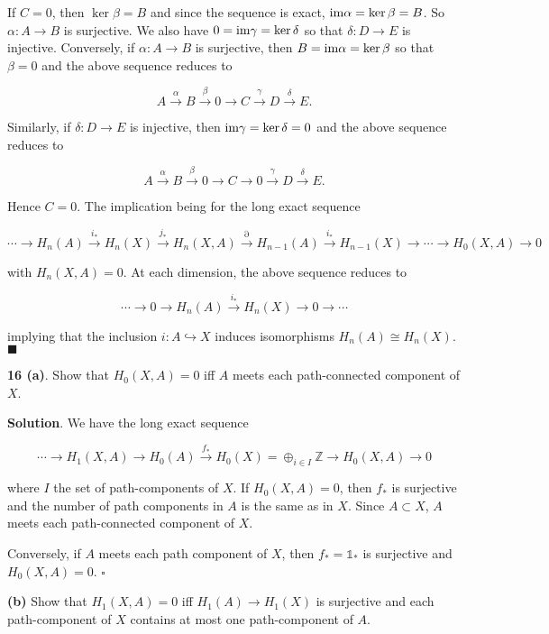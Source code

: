 \documentclass{article}
\newcommand{\Z}{\mathbb{Z}}
\newcommand{\identity}{\mathds{1}}
\newcommand{\im}{\textnormal{im}}
\begin{document}
If $C = 0$, then $\ker \beta = B$ and since the sequence is exact, $\im \alpha = \ker \beta = B$. So $\alpha: A\to B$ is surjective. We also have $0 = \im \gamma = \ker \delta$ so that $\delta:D\to E$ is injective. Conversely, if $\alpha: A\to B$ is surjective, then $B = \im \alpha = \ker \beta$ so that $\beta = 0$ and the above sequence reduces to

$$A\xrightarrow{\alpha} B\xrightarrow{\beta} 0\to C\xrightarrow{\gamma} D\xrightarrow{\delta} E.$$

Similarly, if $\delta: D\to E$ is injective, then $\im \gamma = \ker \delta = 0$ and the above sequence reduces to

$$A\xrightarrow{\alpha} B\xrightarrow{\beta} 0\to C\to 0\xrightarrow{\gamma} D\xrightarrow{\delta} E.$$

Hence $C = 0$. The implication being for the long exact sequence

$$\cdots \to H_{n}(A)\xrightarrow{i_{\ast}} H_{n}(X)\xrightarrow{j_{\ast}}H_{n}(X, A)\xrightarrow{\partial} H_{n-1}(A)\xrightarrow{i_{\ast}} H_{n-1}(X)\to \cdots \to H_{0}(X, A)\to 0$$

with $H_{n}(X, A) = 0$. At each dimension, the above sequence reduces to

$$\cdots\to  0\to H_{n}(A)\xrightarrow{i_{\ast}} H_{n}(X)\to 0\to \cdots $$

implying that the inclusion $i: A\hookrightarrow X$ induces isomorphisms $H_{n}(A)\cong H_{n}(X)$. $\blacksquare$
\bigskip
\bigskip

\textbf{16 (a)}. Show that $H_{0}(X, A) = 0$ iff $A$ meets each path-connected component of $X$.
\medskip

\textbf{Solution}. We have the long exact sequence

$$\cdots \to H_{1}(X, A)\to H_{0}(A)\xrightarrow{f_{\ast}} H_{0}(X) = \oplus_{i\in I} \Z\to H_{0}(X, A)\to 0$$

where $I$ the set of path-components of $X$. If $H_{0}(X, A) = 0$, then $f_{\ast}$ is surjective and the number of path components in $A$ is the same as in $X$. Since $A\subset X$, $A$ meets each path-connected component of $X$. 
\medskip

Conversely, if $A$ meets each path component of $X$, then $f_{\ast} = \identity_{\ast}$ is surjective and $H_{0}(X, A) = 0$. $\square$
\medskip

\textbf{(b)} Show that $H_{1}(X, A) = 0$ iff $H_{1}(A)\to H_{1}(X)$ is surjective and each path-component of $X$ contains at most one path-component of $A$.
\medskip
\end{document}
